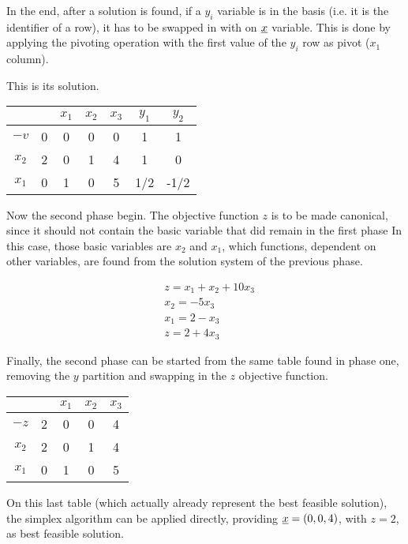 In the end, after a solution is found, if a $y_i$ variable is in the basis (i.e. it is the identifier of a row), it has to be swapped in with on $\underline{x}$ variable.
This is done by applying the pivoting operation with the first value of the $y_i$ row as pivot ($x_1$ column).

This is its solution.

\begin{center}
    \begin{tabular}{c|c|ccc|cc}
        & & $x_1$ & $x_2$ & $x_3$ & $y_1$ & $y_2$ \\ \hline
        $-v$ & 0 & 0 & 0 & 0 & 1 & 1 \\ \hline
        $x_2$ & 2 & 0 & 1 & 4 & 1 & 0 \\
        $x_1$ & 0 & 1 & 0 & 5 & 1/2 & -1/2
    \end{tabular}
\end{center}

Now the second phase begin.
The objective function $z$ is to be made canonical, since it should not contain the basic variable that did remain in the first phase
In this case, those basic variables are $x_2$ and $x_1$, which functions, dependent on other variables, are found from the solution system of the previous phase.

\begin{align*}
& z = x_1 + x_2 + 10 x_3 \\
& x_2 = -5 x_3 \\
& x_1 = 2 - x_3 \\
& z = 2 + 4 x_3
\end{align*}

Finally, the second phase can be started from the same table found in phase one, removing the $y$ partition and swapping in the $z$ objective function.

\begin{center}
    \begin{tabular}{c|c|ccc}
        & & $x_1$ & $x_2$ & $x_3$ \\ \hline
        $-z$ & 2 & 0 & 0 & 4 \\ \hline
        $x_2$ & 2 & 0 & 1 & 4 \\
        $x_1$ & 0 & 1 & 0 & 5
    \end{tabular}
\end{center}

On this last table (which actually already represent the best feasible solution), the simplex algorithm can be applied directly, providing $\underline{x} = (0, 0, 4)$, with $z = 2$, as best feasible solution.
